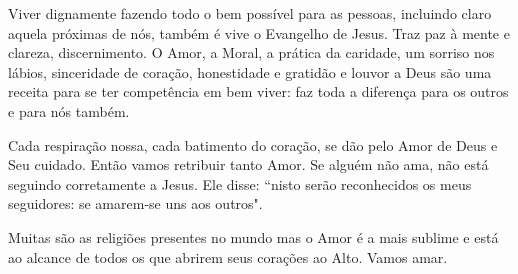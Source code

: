 \emdash{}Viver dignamente fazendo todo o bem possível para as pessoas, incluindo claro aquela próximas de nós, também é vive o Evangelho de Jesus. Traz paz à mente e clareza, discernimento. O Amor, a Moral, a prática da caridade, um sorriso nos lábios, sinceridade de coração, honestidade e gratidão e louvor a Deus são uma receita para se ter competência em bem viver: faz toda a diferença para os outros e para nós também.

\emdash{}Cada respiração nossa, cada batimento do coração, se dão pelo Amor de Deus e Seu cuidado. Então vamos retribuir tanto Amor. Se alguém não ama, não está seguindo corretamente a Jesus. Ele disse: ``nisto serão reconhecidos os meus seguidores: se amarem-se uns aos outros".

\emdash{}Muitas são as religiões presentes no mundo mas o Amor é a mais sublime e está ao alcance de todos os que abrirem seus corações ao Alto. Vamos amar.